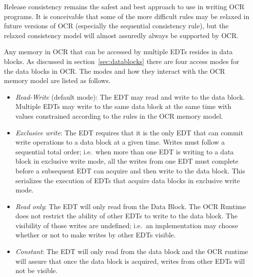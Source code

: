 Release consistency remains the safest and best approach to use in
writing OCR programs. It is conceivable that some of the more
difficult rules may be relaxed in future versions of OCR (especially
the sequential consistency rule), but the relaxed consistency model
will almost assuredly always be supported by OCR.

Any memory in OCR that can be accessed by multiple EDTs resides in data blocks.  As
discussed in section~\ref{sec:datablocks} there
are four access modes for the data blocks in OCR. The modes and how they
interact with the OCR memory model are listed as follows.
\begin{itemize}

\item \emph{Read-Write} (default mode): The EDT may read
and write to the data block.  Multiple EDTs may
write to the same data block at the same time with values constrained according to the
rules in the OCR memory model.

\item \emph{Exclusive write}: The
EDT requires that it is the only EDT that can commit write operations to a data block at a
given time.  Writes must follow a sequential total order; i.e.\ when more than one EDT is writing
to a data block in exclusive write mode, all the writes from one EDT must complete before
a subsequent EDT can acquire and then write to the data block.  This serializes the execution of
EDTs that acquire data blocks in exclusive write mode.

\item \emph{Read only}: The EDT
will only read from the Data Block. The OCR Runtime does
not restrict the ability of other EDTs to write to the data block.  The
visibility of those writes are undefined; i.e.\ an implementation may
choose whether or not to make writes by other EDTs visible.

\item \emph{Constant}: The EDT will only read from the
data block and the OCR runtime will assure that once the data block is acquired,
writes from other EDTs will not be visible.

\end{itemize}


